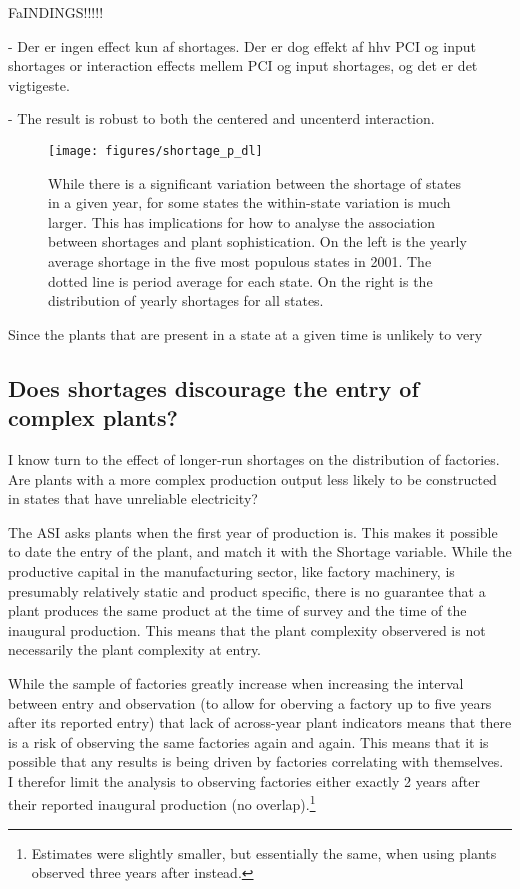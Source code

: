 \documentclass[11pt]{article}
\begin{document}
FaINDINGS!!!!!

- Der er ingen effect kun af shortages. Der er dog effekt af hhv PCI og input shortages or interaction effects mellem PCI og input shortages, og det er det vigtigeste.

- The result is robust to both the centered and uncenterd interaction.

\begin{figure}[htpb]
	\centering
	\texttt{[image: figures/shortage\_p\_dl]}
	\caption{While there is a significant variation between the shortage of states in a given year, for some states the within-state variation is much larger. This has implications for how to analyse the association between shortages and plant sophistication. On the left is the yearly average shortage in the five most populous states in 2001. The dotted line is period average for each state. On the right is the distribution of yearly shortages for all states.}%
	\label{fig:shortage_dist}
\end{figure}

Since the plants that are present in a state at a given time is unlikely to very

\subsection{Does shortages discourage the entry of complex plants?}%
\label{sub:longterm}

I know turn to the effect of longer-run shortages on the distribution of factories. Are plants with a more complex production output less likely to be constructed in states that have unreliable electricity? 

The ASI asks plants when the first year of production is. This makes it possible to date the entry of the plant, and match it with the Shortage variable. While the productive capital in the manufacturing sector, like factory machinery, is presumably relatively static and product specific, there is no guarantee that a plant produces the same product at the time of survey and the time of the inaugural production. This means that the plant complexity observered is not necessarily the plant complexity at entry.

While the sample of factories greatly increase when increasing the interval between entry and observation (to allow for oberving a factory up to five years after its reported entry) that lack of across-year plant indicators means that there is a risk of observing the same factories again and again. This means that it is possible that any results is being driven by factories correlating with themselves. I therefor limit the analysis to observing factories either exactly 2 years after their reported inaugural production (no overlap).\footnote{Estimates were slightly smaller, but essentially the same, when using plants observed three years after instead.}  
\end{document}
